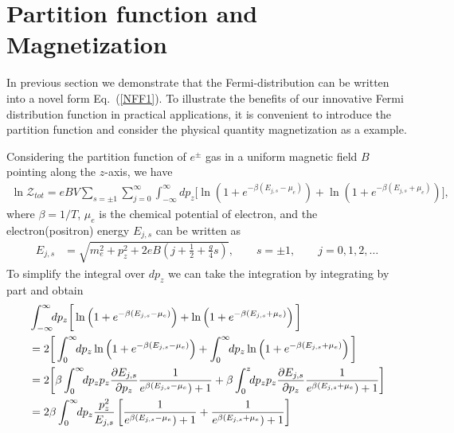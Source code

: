 \documentclass[sn-mathphys,Numbered]{sn-jnl}
\begin{document}

\section{Partition function and Magnetization}\label{NumericalResult}

In previous section we demonstrate that the Fermi-distribution can be written into a novel form Eq.~(\ref{NFF1}). To illustrate the benefits of our innovative Fermi distribution function in practical applications, it is convenient to introduce the partition function and consider the physical quantity magnetization as a example.

Considering the partition function of $e^\pm$ gas in a uniform magnetic field $B$ pointing along the $z$-axis, we have
\begin{align}
\ln\mathcal{Z}_{tot}=eBV\!\!\sum_{s=\pm1}\sum_{j=0}^\infty\int^\infty_{-\infty} \!\!dp_z\bigg[\ln\left(1+e^{-\beta(E_{j,s}-\mu_e)}\right)+\ln\left(1+e^{-\beta(E_{j,s}+\mu_e)}\right)\bigg],
\end{align}
where $\beta=1/T$, $\mu_e$ is the chemical potential of electron, and the electron(positron) energy $E_{j,s}$ can be written as
\begin{align}
E_{j,s}&=\sqrt{m^2_e+p^2_z+2eB\left(j+\frac{1}{2}+\frac{g}{4}s\right)},\qquad s=\pm1,\qquad j=0,1,2,\dots
\end{align}
To simplify the integral over $dp_z$ we can take  the integration by integrating by part and obtain
\begin{align}
&\int^\infty_{-\infty} \!\!dp_z\bigg[\ln\left(1+e^{-\beta(E_{j,s}-\mu_e)}\right)+\ln\left(1+e^{-\beta(E_{j,s}+\mu_e)}\right)\bigg]\notag\\
&=2\bigg[\int_0^\infty\!\!dp_z\ln\left(1+e^{-\beta(E_{j,s}-\mu_e)}\right)+\int_0^\infty\!\!dp_z\ln\left(1+e^{-\beta(E_{j,s}+\mu_e)}\right)\bigg]\\
&=2\bigg[\beta\int_0^\infty\!\!dp_z p_z\frac{\partial E_{j,s}}{\partial p_z}\frac{1}{e^{\beta(E_{j,s}-\mu_e})+1}+\beta\int_0^z\!\!dp_z p_z\frac{\partial E_{j,s}}{\partial p_z}\frac{1}{e^{\beta(E_{j,s}+\mu_e})+1}\bigg]\\
&=2\beta\int_0^\infty\!\!dp_z \frac{p_z^2}{E_{j,s}}\left[\frac{1}{e^{\beta(E_{j,s}-\mu_e})+1}+\frac{1}{e^{\beta(E_{j,s}+\mu_e})+1}\right]
\end{align}
\end{document}
